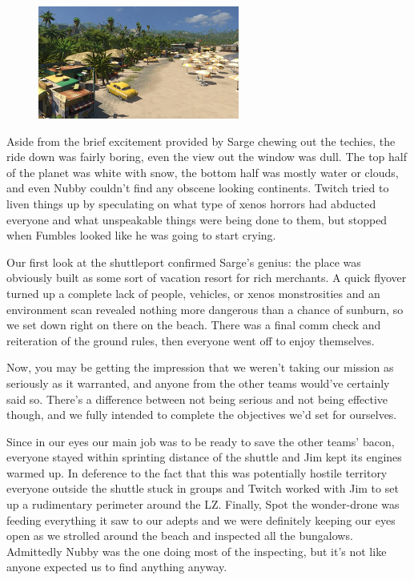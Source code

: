 \begin{figure}
	\begin{center}
		\includegraphics[width=\figwidth]{pics/11/15.png}
	\end{center}
\end{figure}
Aside from the brief excitement provided by Sarge chewing out the techies, the ride down was fairly boring, even the view out the window was dull. 
The top half of the planet was white with snow, the bottom half was mostly water or clouds, and even Nubby couldn't find any obscene looking continents. 
Twitch tried to liven things up by speculating on what type of xenos horrors had abducted everyone and what unspeakable things were being done to them, but stopped when Fumbles looked like he was going to start crying.

Our first look at the shuttleport confirmed Sarge's genius: 
the place was obviously built as some sort of vacation resort for rich merchants. 
A quick flyover turned up a complete lack of people, vehicles, or xenos monstrosities and an environment scan revealed nothing more dangerous than a chance of sunburn, so we set down right on there on the beach. 
There was a final comm check and reiteration of the ground rules, then everyone went off to enjoy themselves.

Now, you may be getting the impression that we weren't taking our mission as seriously as it warranted, and anyone from the other teams would've certainly said so. 
There's a difference between not being serious and not being effective though, and we fully intended to complete the objectives we'd set for ourselves. 


Since in our eyes our main job was to be ready to save the other teams' bacon, everyone stayed within sprinting distance of the shuttle and Jim kept its engines warmed up. 
In deference to the fact that this was potentially hostile territory everyone outside the shuttle stuck in groups and Twitch worked with Jim to set up a rudimentary perimeter around the LZ. 
Finally, Spot the wonder-drone was feeding everything it saw to our adepts and we were definitely keeping our eyes open as we strolled around the beach and inspected all the bungalows. 
Admittedly Nubby was the one doing most of the inspecting, but it's not like anyone expected us to find anything anyway.

